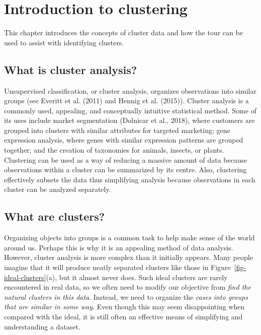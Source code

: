 \documentclass[
  letterpaper,
]{krantz}
\begin{document}
\chapter{Introduction to clustering}\label{introduction-to-clustering}

This chapter introduces the concepts of cluster data and how the tour
can be used to assist with identifying clusters.

\section{What is cluster analysis?}\label{what-is-cluster-analysis}

Unsupervised classification, or cluster analysis, organizes observations
into similar groups (see Everitt et al. (2011) and Hennig et al.
(2015)). Cluster analysis is a commonly used, appealing, and
conceptually intuitive statistical method. Some of its uses include
market segmentation (Dolnicar et al., 2018), where customers are grouped
into clusters with similar attributes for targeted marketing; gene
expression analysis, where genes with similar expression patterns are
grouped together; and the creation of taxonomies for animals, insects,
or plants. Clustering can be used as a way of reducing a massive amount
of data because observations within a cluster can be summarized by its
centre. Also, clustering effectively subsets the data thus simplifying
analysis because observations in each cluster can be analyzed
separately.

\section{What are clusters?}\label{what-are-clusters}

Organizing objects into groups is a common task to help make sense of
the world around us. Perhaps this is why it is an appealing method of
data analysis. However, cluster analysis is more complex than it
initially appears. Many people imagine that it will produce neatly
separated clusters like those in Figure~\ref{fig-ideal-clusters}(a), but
it almost never does. Such ideal clusters are rarely encountered in real
data, so we often need to modify our objective from \emph{find the
natural clusters in this data}. Instead, we need to organize the
\emph{cases into groups that are similar in some way}. Even though this
may seem disappointing when compared with the ideal, it is still often
an effective means of simplifying and understanding a dataset.
\end{document}
